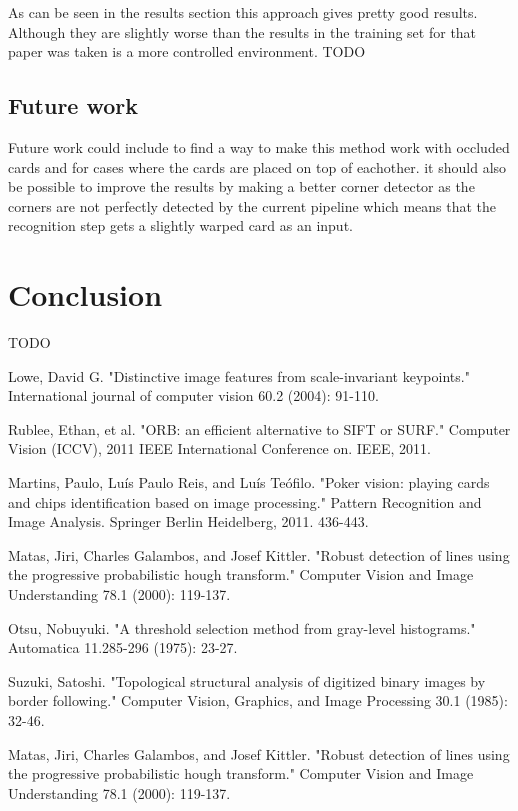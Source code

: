 \documentclass[journal,twoside]{IEEEtran}
\begin{document}
As can be seen in the results section this approach gives pretty good results. Although they are slightly worse than the results in \cite{PokerVision} the training set for that paper was taken is a more controlled environment. TODO


\subsection{Future work}

Future work could include to find a way to make this method work with occluded cards and for cases where the cards are placed on top of eachother. it should also be possible to improve the results by making a better corner detector as the corners are not perfectly detected by the current pipeline which means that the recognition step gets a slightly warped card as an input.


\section{Conclusion}

TODO

\begin{thebibliography}{9}

Lowe, David G. "Distinctive image features from scale-invariant keypoints." International journal of computer vision 60.2 (2004): 91-110.

Rublee, Ethan, et al. "ORB: an efficient alternative to SIFT or SURF." Computer Vision (ICCV), 2011 IEEE International Conference on. IEEE, 2011.

Martins, Paulo, Luís Paulo Reis, and Luís Teófilo. "Poker vision: playing cards and chips identification based on image processing." Pattern Recognition and Image Analysis. Springer Berlin Heidelberg, 2011. 436-443.

Matas, Jiri, Charles Galambos, and Josef Kittler. "Robust detection of lines using the progressive probabilistic hough transform." Computer Vision and Image Understanding 78.1 (2000): 119-137.

Otsu, Nobuyuki. "A threshold selection method from gray-level histograms." Automatica 11.285-296 (1975): 23-27.

Suzuki, Satoshi. "Topological structural analysis of digitized binary images by border following." Computer Vision, Graphics, and Image Processing 30.1 (1985): 32-46.

Matas, Jiri, Charles Galambos, and Josef Kittler. "Robust detection of lines using the progressive probabilistic hough transform." Computer Vision and Image Understanding 78.1 (2000): 119-137.




\end{thebibliography}
\end{document}
